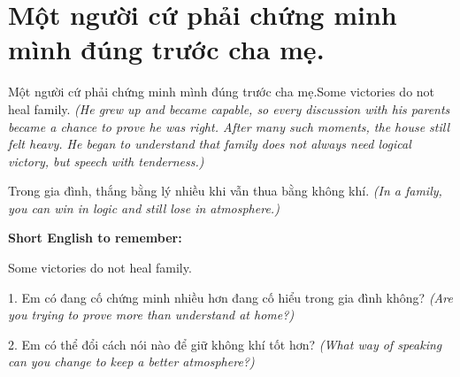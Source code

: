 \section{Một người cứ phải chứng minh mình đúng trước cha mẹ.}
\begin{truyen}{Một người cứ phải chứng minh mình đúng trước cha mẹ.}{Some victories do not heal family.}
\textit{(He grew up and became capable, so every discussion with his parents became a chance to prove he was right. After many such moments, the house still felt heavy. He began to understand that family does not always need logical victory, but speech with tenderness.)}
\end{truyen}
\begin{baihoc}
Trong gia đình, thắng bằng lý nhiều khi vẫn thua bằng không khí.
\textit{(In a family, you can win in logic and still lose in atmosphere.)}
\end{baihoc}
\begin{ghinhoanh}\textbf{Short English to remember:}

Some victories do not heal family.
\end{ghinhoanh}
\begin{tuhocnhanh}
1. Em có đang cố chứng minh nhiều hơn đang cố hiểu trong gia đình không? \textit{(Are you trying to prove more than understand at home?)}

2. Em có thể đổi cách nói nào để giữ không khí tốt hơn? \textit{(What way of speaking can you change to keep a better atmosphere?)}
\end{tuhocnhanh}
\ngancach

